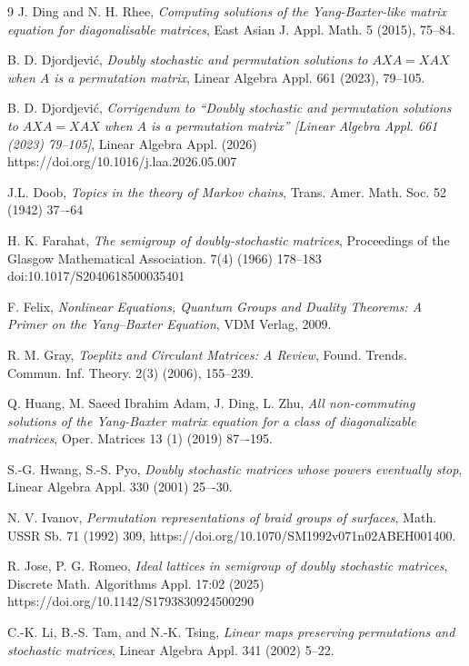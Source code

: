\documentclass{article}
\theoremstyle{definition}\newtheorem{example}{Example}[section]
\begin{document}
\begin{thebibliography}{9}
		 J. Ding and N. H. Rhee, {\it Computing solutions of the Yang-Baxter-like matrix equation for diagonalisable matrices}, East Asian J. Appl. Math. 5 (2015), 75--84.
		
		
		 B. D. Djordjevi\'c, {\it Doubly stochastic and permutation solutions to $AXA=XAX$ when $A$ is a permutation matrix}, Linear Algebra Appl. 661 (2023), 79--105.
		
		 B. D. Djordjevi\'c, {\it Corrigendum to  ``Doubly stochastic and permutation solutions to $AXA=XAX$ when $A$ is a permutation matrix'' [Linear Algebra Appl. 661 (2023) 79--105]}, Linear Algebra Appl.
		(2026) https://doi.org/10.1016/j.laa.2026.05.007
		
		 J.L. Doob, {\it Topics in the theory of Markov chains}, Trans. Amer. Math. Soc. 52 (1942) 37–-64
		
		
		 H. K. Farahat, {\it The semigroup of doubly-stochastic matrices}, Proceedings of the Glasgow Mathematical Association. 7(4) (1966) 178--183  doi:10.1017/S2040618500035401
		
		 F. Felix, {\it Nonlinear Equations, Quantum Groups and Duality Theorems: A Primer on the Yang–Baxter Equation}, VDM Verlag, 2009.
		
		
		 R. M. Gray,
		{\it Toeplitz and Circulant Matrices: A Review},
		Found. Trends. Commun. Inf. Theory.
		2(3) (2006), 155--239.
		
		 Q. Huang, M. Saeed Ibrahim Adam, J. Ding, L. Zhu, {\it All non-commuting
			solutions of the Yang-Baxter matrix equation for a class of diagonalizable
			matrices}, Oper. Matrices 13 (1) (2019) 87–-195.
		
		 S.-G. Hwang, S.-S. Pyo, {\it Doubly stochastic matrices whose powers eventually stop}, Linear Algebra Appl. 330 (2001) 25–-30.
		
		  N. V. Ivanov, {\it Permutation representations of braid groups of surfaces}, Math. USSR Sb. 71 (1992) 309, https://doi.org/10.1070/SM1992v071n02ABEH001400.
		
		 R. Jose, P. G. Romeo, {\it Ideal lattices in semigroup of doubly stochastic matrices}, Discrete Math. Algorithms Appl. 17:02 (2025) https://doi.org/10.1142/S1793830924500290
		
		 C.-K. Li, B.-S. Tam, and N.-K. Tsing, {\it Linear maps preserving permutations and stochastic matrices}, Linear Algebra Appl. 341 (2002) 5--22.
		

\end{thebibliography}
\end{document}
